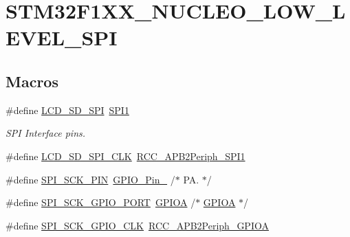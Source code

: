 \hypertarget{group___s_t_m32_f1_x_x___n_u_c_l_e_o___l_o_w___l_e_v_e_l___s_p_i}{}\section{S\+T\+M32\+F1\+X\+X\+\_\+\+N\+U\+C\+L\+E\+O\+\_\+\+L\+O\+W\+\_\+\+L\+E\+V\+E\+L\+\_\+\+S\+PI}
\label{group___s_t_m32_f1_x_x___n_u_c_l_e_o___l_o_w___l_e_v_e_l___s_p_i}
\subsection*{Macros}
\begin{DoxyCompactItemize}
\item 
\#define \mbox{\hyperlink{group___s_t_m32_f1_x_x___n_u_c_l_e_o___l_o_w___l_e_v_e_l___s_p_i_ga323b5431fba170151f0fc83a3c72f352}{L\+C\+D\+\_\+\+S\+D\+\_\+\+S\+PI}}~\mbox{\hyperlink{group___peripheral__declaration_gad483be344a28ac800be8f03654a9612f}{S\+P\+I1}}
\begin{DoxyCompactList}\small\item\em S\+PI Interface pins. \end{DoxyCompactList}\item 
\#define \mbox{\hyperlink{group___s_t_m32_f1_x_x___n_u_c_l_e_o___l_o_w___l_e_v_e_l___s_p_i_ga074e889f20cfe30afac8c0987aff28c4}{L\+C\+D\+\_\+\+S\+D\+\_\+\+S\+P\+I\+\_\+\+C\+LK}}~\mbox{\hyperlink{group___a_p_b2__peripheral_ga289cc086580f4b6a080ea0ed3dd4a7af}{R\+C\+C\+\_\+\+A\+P\+B2\+Periph\+\_\+\+S\+P\+I1}}
\item 
\#define \mbox{\hyperlink{group___s_t_m32_f1_x_x___n_u_c_l_e_o___l_o_w___l_e_v_e_l___s_p_i_gaee89f642bb559e12db93e9f412ea185e}{S\+P\+I\+\_\+\+S\+C\+K\+\_\+\+P\+IN}}~\mbox{\hyperlink{group___g_p_i_o__pins__define_ga32dbe930f52ce5ab60190c65e9dc741e}{G\+P\+I\+O\+\_\+\+Pin\+\_}}                  /$\ast$ P\+A. $\ast$/
\item 
\#define \mbox{\hyperlink{group___s_t_m32_f1_x_x___n_u_c_l_e_o___l_o_w___l_e_v_e_l___s_p_i_ga3bc07bc1a9104b333dfc43b5a5fda656}{S\+P\+I\+\_\+\+S\+C\+K\+\_\+\+G\+P\+I\+O\+\_\+\+P\+O\+RT}}~\mbox{\hyperlink{group___peripheral__declaration_gac485358099728ddae050db37924dd6b7}{G\+P\+I\+OA}}                       /$\ast$ \mbox{\hyperlink{group___peripheral__declaration_gac485358099728ddae050db37924dd6b7}{G\+P\+I\+OA}} $\ast$/
\item 
\#define \mbox{\hyperlink{group___s_t_m32_f1_x_x___n_u_c_l_e_o___l_o_w___l_e_v_e_l___s_p_i_gafc3990b92a1f8c6951299ec49394414b}{S\+P\+I\+\_\+\+S\+C\+K\+\_\+\+G\+P\+I\+O\+\_\+\+C\+LK}}~\mbox{\hyperlink{group___a_p_b2__peripheral_ga44b92fbf2e288796b1acbce2708f3636}{R\+C\+C\+\_\+\+A\+P\+B2\+Periph\+\_\+\+G\+P\+I\+OA}}

\end{DoxyCompactItemize}
